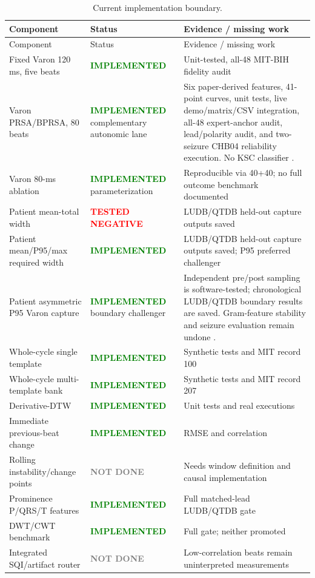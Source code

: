 \documentclass[11pt,a4paper]{article}
\newcommand{\implemented}{\textcolor{green}{\textbf{IMPLEMENTED}}}
\newcommand{\testednegative}{\textcolor{red}{\textbf{TESTED NEGATIVE}}}
\newcommand{\notdone}{\textcolor{gray}{\textbf{NOT DONE}}}
\begin{document}
\begin{longtable}{p{}p{}p{}}
\caption{Current implementation boundary.}\\
\toprule
Component & Status & Evidence / missing work \\
\midrule
\endfirsthead
\toprule
Component & Status & Evidence / missing work \\
\midrule
\endhead
Fixed Varon 120 ms, five beats & \implemented & Unit-tested, all-48 MIT-BIH fidelity audit \\
Varon PRSA/BPRSA, 80 beats & \implemented{} complementary autonomic lane & Six paper-derived features, 41-point curves, unit tests, live demo/matrix/CSV integration, all-48 expert-anchor audit, lead/polarity audit, and two-seizure CHB04 reliability execution. No KSC classifier \cite{varon2015}. \\
Varon 80-ms ablation & \implemented{} parameterization & Reproducible via 40+40; no full outcome benchmark documented \\
Patient mean-total width & \testednegative & LUDB/QTDB held-out capture outputs saved \\
Patient mean/P95/max required width & \implemented & LUDB/QTDB held-out capture outputs saved; P95 preferred challenger \\
Patient asymmetric P95 Varon capture & \implemented{} boundary challenger & Independent pre/post sampling is software-tested; chronological LUDB/QTDB boundary results are saved. Gram-feature stability and seizure evaluation remain undone \cite{martinez2004,illanes2007,singh2013,lorenz2021}. \\
Whole-cycle single template & \implemented & Synthetic tests and MIT record 100 \\
Whole-cycle multi-template bank & \implemented & Synthetic tests and MIT record 207 \\
Derivative-DTW & \implemented & Unit tests and real executions \\
Immediate previous-beat change & \implemented & RMSE and correlation \\
Rolling instability/change points & \notdone & Needs window definition and causal implementation \\
Prominence P/QRS/T features & \implemented & Full matched-lead LUDB/QTDB gate \\
DWT/CWT benchmark & \implemented & Full gate; neither promoted \\
Integrated SQI/artifact router & \notdone & Low-correlation beats remain uninterpreted measurements \\

\end{longtable}
\end{document}
